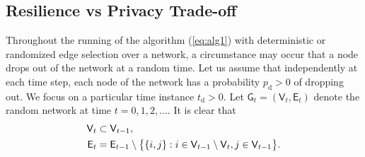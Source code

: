 \documentclass[a4paper, 11pt]{article}
\newcommand{\1}{\mathbf{1}}
\newcommand{\tdropout}{t_{\mathrm d}}
\newcommand{\pdropout}{p_{\mathrm d}}
\newcommand{\mGrand}{\mathsf{G}}
\newcommand{\mVrand}{\mathsf{V}}
\newcommand{\mErand}{\mathsf{E}}
\begin{document}
\subsection{Resilience vs Privacy   Trade-off}
Throughout the running of the algorithm (\ref{eq:alg1}) with deterministic or randomized edge selection over a network, a circumstance may occur that a node   drops out of the network   at a random time. Let us assume that independently at each time step, each node of the network has a probability $\pdropout>0$ of dropping out. We focus on a particular time instance $\tdropout>0$. Let $\mGrand_t=(\mVrand_t,\mErand_t)$ denote the random network at time $t=0,1,2,\dots$. It is clear that
\begin{align}
\mVrand_{t}&\subset\mVrand_{t-1},\notag\\
\mErand_{t}&=\mErand_{t-1}\setminus\big\{\{i,j\}:i\in\mVrand_{t-1}\setminus\mVrand_{t},j\in\mVrand_{t-1}\big\}.\notag
\end{align}
\end{document}
